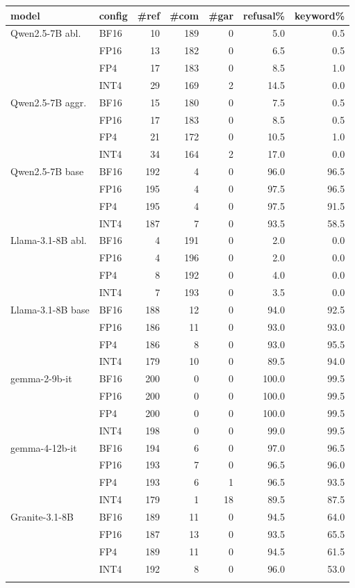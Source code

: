\begin{tabular}{@{}>{\raggedright\arraybackslash}p{1.45cm} l r r r r r@{}}
\toprule
model & config & \#ref & \#com & \#gar & refusal\% & keyword\% \\
\midrule
Qwen2.5-7B abl. & BF16 & 10 & 189 & 0 & 5.0 & 0.5 \\
 & FP16 & 13 & 182 & 0 & 6.5 & 0.5 \\
 & FP4 & 17 & 183 & 0 & 8.5 & 1.0 \\
 & INT4 & 29 & 169 & 2 & 14.5 & 0.0 \\
\addlinespace
Qwen2.5-7B aggr. & BF16 & 15 & 180 & 0 & 7.5 & 0.5 \\
 & FP16 & 17 & 183 & 0 & 8.5 & 0.5 \\
 & FP4 & 21 & 172 & 0 & 10.5 & 1.0 \\
 & INT4 & 34 & 164 & 2 & 17.0 & 0.0 \\
\addlinespace
Qwen2.5-7B base & BF16 & 192 & 4 & 0 & 96.0 & 96.5 \\
 & FP16 & 195 & 4 & 0 & 97.5 & 96.5 \\
 & FP4 & 195 & 4 & 0 & 97.5 & 91.5 \\
 & INT4 & 187 & 7 & 0 & 93.5 & 58.5 \\
\addlinespace
Llama-3.1-8B abl. & BF16 & 4 & 191 & 0 & 2.0 & 0.0 \\
 & FP16 & 4 & 196 & 0 & 2.0 & 0.0 \\
 & FP4 & 8 & 192 & 0 & 4.0 & 0.0 \\
 & INT4 & 7 & 193 & 0 & 3.5 & 0.0 \\
\addlinespace
Llama-3.1-8B base & BF16 & 188 & 12 & 0 & 94.0 & 92.5 \\
 & FP16 & 186 & 11 & 0 & 93.0 & 93.0 \\
 & FP4 & 186 & 8 & 0 & 93.0 & 95.5 \\
 & INT4 & 179 & 10 & 0 & 89.5 & 94.0 \\
\addlinespace
gemma-2-9b-it & BF16 & 200 & 0 & 0 & 100.0 & 99.5 \\
 & FP16 & 200 & 0 & 0 & 100.0 & 99.5 \\
 & FP4 & 200 & 0 & 0 & 100.0 & 99.5 \\
 & INT4 & 198 & 0 & 0 & 99.0 & 99.5 \\
\addlinespace
gemma-4-12b-it & BF16 & 194 & 6 & 0 & 97.0 & 96.5 \\
 & FP16 & 193 & 7 & 0 & 96.5 & 96.0 \\
 & FP4 & 193 & 6 & 1 & 96.5 & 93.5 \\
 & INT4 & 179 & 1 & 18 & 89.5 & 87.5 \\
\addlinespace
Granite-3.1-8B & BF16 & 189 & 11 & 0 & 94.5 & 64.0 \\
 & FP16 & 187 & 13 & 0 & 93.5 & 65.5 \\
 & FP4 & 189 & 11 & 0 & 94.5 & 61.5 \\
 & INT4 & 192 & 8 & 0 & 96.0 & 53.0 \\
\addlinespace
\bottomrule
\end{tabular}
